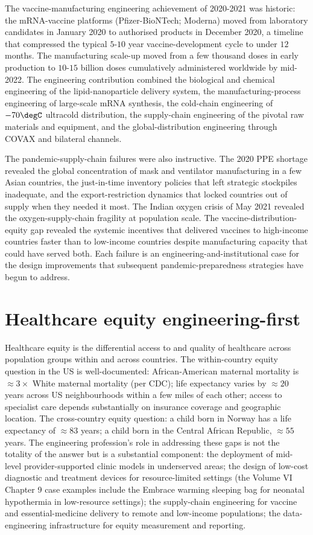 The vaccine-manufacturing engineering achievement of 2020-2021 was historic: the mRNA-vaccine platforms (Pfizer-BioNTech; Moderna) moved from laboratory candidates in January 2020 to authorised products in December 2020, a timeline that compressed the typical $5$-$10$ year vaccine-development cycle to under $12$ months. The manufacturing scale-up moved from a few thousand doses in early production to $10$-$15$ billion doses cumulatively administered worldwide by mid-2022. The engineering contribution combined the biological and chemical engineering of the lipid-nanoparticle delivery system, the manufacturing-process engineering of large-scale mRNA synthesis, the cold-chain engineering of $-70\degC$ ultracold distribution, the supply-chain engineering of the pivotal raw materials and equipment, and the global-distribution engineering through COVAX and bilateral channels.

The pandemic-supply-chain failures were also instructive. The 2020 PPE shortage \cite{paper:cohen-pandemic-supply-2020} revealed the global concentration of mask and ventilator manufacturing in a few Asian countries, the just-in-time inventory policies that left strategic stockpiles inadequate, and the export-restriction dynamics that locked countries out of supply when they needed it most. The Indian oxygen crisis of May 2021 revealed the oxygen-supply-chain fragility at population scale. The vaccine-distribution-equity gap revealed the systemic incentives that delivered vaccines to high-income countries faster than to low-income countries despite manufacturing capacity that could have served both. Each failure is an engineering-and-institutional case for the design improvements that subsequent pandemic-preparedness strategies have begun to address.

\section{Healthcare equity engineering-first}

Healthcare equity is the differential access to and quality of healthcare across population groups within and across countries. The within-country equity question in the US is well-documented: African-American maternal mortality is $\approx 3\times$ White maternal mortality (per CDC); life expectancy varies by $\approx 20$ years across US neighbourhoods within a few miles of each other; access to specialist care depends substantially on insurance coverage and geographic location. The cross-country equity question: a child born in Norway has a life expectancy of $\approx 83$ years; a child born in the Central African Republic, $\approx 55$ years. The engineering profession's role in addressing these gaps is not the totality of the answer but is a substantial component: the deployment of mid-level provider-supported clinic models in underserved areas; the design of low-cost diagnostic and treatment devices for resource-limited settings (the Volume VI Chapter 9 case examples include the Embrace warming sleeping bag for neonatal hypothermia in low-resource settings); the supply-chain engineering for vaccine and essential-medicine delivery to remote and low-income populations; the data-engineering infrastructure for equity measurement and reporting.

